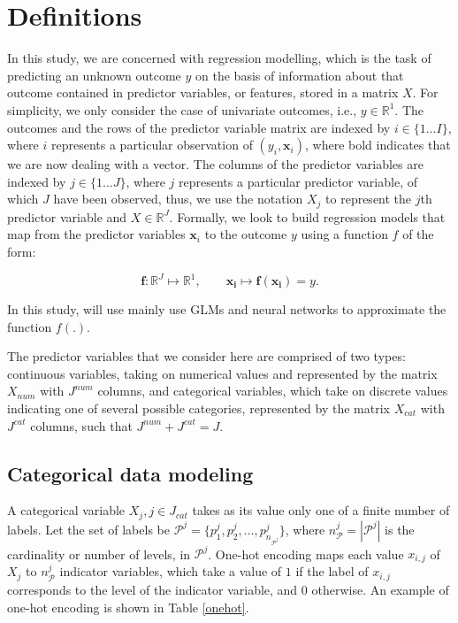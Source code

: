 \documentclass{article}
\begin{document}
\hypertarget{defns}{%
\section{Definitions}\label{defns}}

In this study, we are concerned with regression modelling, which is the
task of predicting an unknown outcome \(y\) on the basis of information
about that outcome contained in predictor variables, or features, stored
in a matrix \(X\). For simplicity, we only consider the case of
univariate outcomes, i.e., \(y \in \mathbb{R}^1\). The outcomes and the
rows of the predictor variable matrix are indexed by
\(i \in \{1 \dots I\}\), where \(i\) represents a particular observation
of \((y_i, \mathbf{x}_i)\), where bold indicates that we are now dealing
with a vector. The columns of the predictor variables are indexed by
\(j \in \{1 \dots J\}\), where \(j\) represents a particular predictor
variable, of which \(J\) have been observed, thus, we use the notation
\(X_j\) to represent the \(j\)th predictor variable and
\(X \in \mathbb{R}^J\). Formally, we look to build regression models
that map from the predictor variables \(\mathbf{x}_i\) to the outcome
\(y\) using a function \(f\) of the form:

\[
\mathbf{f} : \mathbb{R}^J \mapsto \mathbb{R}^1, \quad \quad \mathbf{x_i} \mapsto  \mathbf f{(\mathbf{x_i})} = y. 
\]

In this study, will use mainly use GLMs and neural networks to
approximate the function \(f(.)\).

The predictor variables that we consider here are comprised of two
types: continuous variables, taking on numerical values and represented
by the matrix \(X_{num}\) with \(J^{num}\) columns, and categorical
variables, which take on discrete values indicating one of several
possible categories, represented by the matrix \(X_{cat}\) with
\(J^{cat}\) columns, such that \(J^{num} + J^{cat} = J\).

\hypertarget{categorical-data-modeling}{%
\subsection{Categorical data modeling}\label{categorical-data-modeling}}

A categorical variable \(X_j, j \in J_{cat}\) takes as its value only
one of a finite number of labels. Let the set of labels be
\(\mathcal{P}^j = \{p^j_1, p^j_2,\dots, p^j_{n_{\mathcal{P}^j}} \}\),
where \(n_\mathcal{P}^j = |\mathcal{P}^j|\) is the cardinality or number
of levels, in \(\mathcal{P}^j\). One-hot encoding maps each value
\(x_{i,j}\) of \(X_j\) to \(n_\mathcal{P}^j\) indicator variables, which
take a value of \(1\) if the label of \(x_{i,j}\) corresponds to the
level of the indicator variable, and \(0\) otherwise. An example of
one-hot encoding is shown in Table \ref{onehot}.
\end{document}
